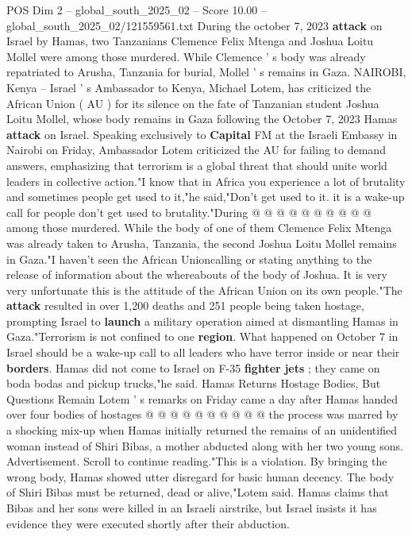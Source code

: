 \begin{textsample}{POS Dim 2 – global\_south\_2025\_02 – Score 10.00 – global\_south\_2025\_02/121559561.txt}  \label{ex:f2_pos_380}
During the october 7, 2023 \textbf{attack} on Israel by Hamas, two Tanzanians Clemence Felix Mtenga and Joshua Loitu Mollel were among those murdered.
While Clemence ' s body was already repatriated to Arusha, Tanzania for burial, Mollel ' s remains in Gaza.
NAIROBI, Kenya -- Israel ' s Ambassador to Kenya, Michael Lotem, has criticized the African Union ( AU ) for its silence on the fate of Tanzanian student Joshua Loitu Mollel, whose body remains in Gaza following the October 7, 2023 Hamas \textbf{attack} on Israel.
Speaking exclusively to \textbf{Capital} FM at the Israeli Embassy in Nairobi on Friday, Ambassador Lotem criticized the AU for failing to demand answers, emphasizing that terrorism is a global threat that should unite world leaders in collective action."I know that in Africa you experience a lot of brutality and sometimes people get used to it,"he said,"Don't get used to it. it is a wake-up call for people don't get used to brutality."During @ @ @ @ @ @ @ @ @ @ among those murdered.
While the body of one of them Clemence Felix Mtenga was already taken to Arusha, Tanzania, the second Joshua Loitu Mollel remains in Gaza."I haven't seen the African Unioncalling or stating anything to the release of information about the whereabouts of the body of Joshua.
It is very very unfortunate this is the attitude of the African Union on its own people."The \textbf{attack} resulted in over 1,200 deaths and 251 people being taken hostage, prompting Israel to \textbf{launch} a military operation aimed at dismantling Hamas in Gaza."Terrorism is not confined to one \textbf{region}.
What happened on October 7 in Israel should be a wake-up call to all leaders who have terror inside or near their \textbf{borders}.
Hamas did not come to Israel on F-35 \textbf{fighter} \textbf{jets} ; they came on boda bodas and pickup trucks,"he said.
Hamas Returns Hostage Bodies, But Questions Remain Lotem ' s remarks on Friday came a day after Hamas handed over four bodies of hostages @ @ @ @ @ @ @ @ @ @ the process was marred by a shocking mix-up when Hamas initially returned the remains of an unidentified woman instead of Shiri Bibas, a mother abducted along with her two young sons.
Advertisement.
Scroll to continue reading."This is a violation.
By bringing the wrong body, Hamas showed utter disregard for basic human decency.
The body of Shiri Bibas must be returned, dead or alive,"Lotem said.
Hamas claims that Bibas and her sons were killed in an Israeli airstrike, but Israel insists it has evidence they were executed shortly after their abduction.

\end{textsample}
